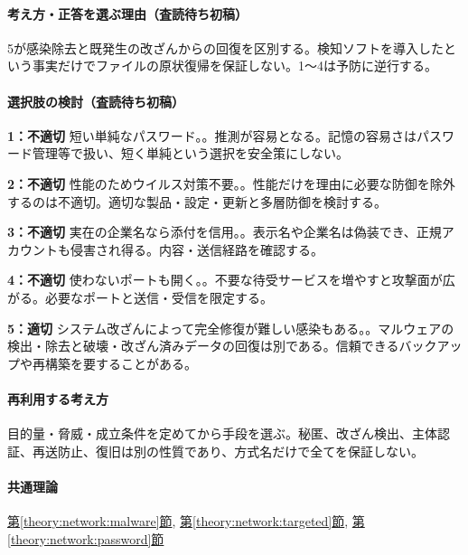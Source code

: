 \paragraph{考え方・正答を選ぶ理由（査読待ち初稿）} 5が感染除去と既発生の改ざんからの回復を区別する。検知ソフトを導入したという事実だけでファイルの原状復帰を保証しない。1〜4は予防に逆行する。

\paragraph{選択肢の検討（査読待ち初稿）}\mbox{}\par

\noindent\textbf{1：不適切} 短い単純なパスワード。。推測が容易となる。記憶の容易さはパスワード管理等で扱い、短く単純という選択を安全策にしない。\par

\noindent\textbf{2：不適切} 性能のためウイルス対策不要。。性能だけを理由に必要な防御を除外するのは不適切。適切な製品・設定・更新と多層防御を検討する。\par

\noindent\textbf{3：不適切} 実在の企業名なら添付を信用。。表示名や企業名は偽装でき、正規アカウントも侵害され得る。内容・送信経路を確認する。\par

\noindent\textbf{4：不適切} 使わないポートも開く。。不要な待受サービスを増やすと攻撃面が広がる。必要なポートと送信・受信を限定する。\par

\noindent\textbf{5：適切} システム改ざんによって完全修復が難しい感染もある。。マルウェアの検出・除去と破壊・改ざん済みデータの回復は別である。信頼できるバックアップや再構築を要することがある。\par

\paragraph{再利用する考え方} 目的量・脅威・成立条件を定めてから手段を選ぶ。秘匿、改ざん検出、主体認証、再送防止、復旧は別の性質であり、方式名だけで全てを保証しない。

\paragraph{共通理論} \hyperref[theory:network:malware]{第\ref*{theory:network:malware}節}, \hyperref[theory:network:targeted]{第\ref*{theory:network:targeted}節}, \hyperref[theory:network:password]{第\ref*{theory:network:password}節}

